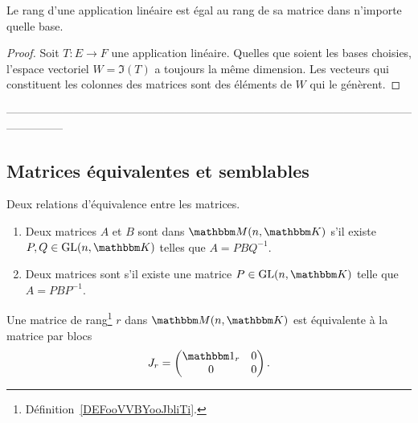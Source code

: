 \begin{proposition}     \label{PROPooEGNBooIffJXc}
    Le rang d'une application linéaire est égal au rang de sa matrice dans n'importe quelle base.
\end{proposition}

\begin{proof}
  Soit \( T: E \to F \) une application linéaire. Quelles que soient les bases choisies, l'espace vectoriel \( W = \Im(T) \) a toujours la même dimension. Les vecteurs qui constituent les colonnes des matrices sont des éléments de \( W \) qui le génèrent.
\end{proof}

---------------------------------------------------------------------------------------------------------------------------
\subsection{Matrices équivalentes et semblables}

\begin{definition}  \label{DefBLELooTvlHoB}
    Deux relations d'équivalence entre les matrices.
    \begin{enumerate}
        \item   \label{ItemPFXCooOUbSCt}
    Deux matrices \( A\) et \( B\) sont  dans \( \eM(n,\eK)\) s'il existe \( P,Q\in\GL(n,\eK)\) telles que \( A=PBQ^{-1}\).
\item
    Deux matrices sont  s'il existe une matrice \( P\in \GL(n,\eK)\) telle que \( A=PBP^{-1}\).
    \end{enumerate}
\end{definition}

\begin{lemma}   \label{LemZMxxnfM}
    Une matrice de rang\footnote{Définition~\ref{DEFooVVBYooJbliTi}.} \( r\) dans \( \eM(n,\eK)\) est équivalente à la matrice par blocs
    \begin{equation}
        J_r=\begin{pmatrix}
            \mtu_r    &   0    \\
            0    &   0
        \end{pmatrix}.
    \end{equation}
\end{lemma}

